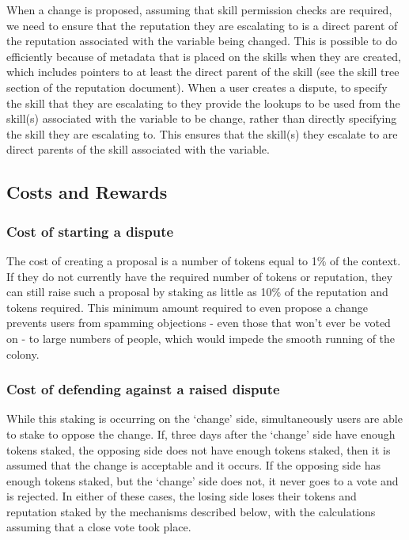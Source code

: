 When a change is proposed, assuming that skill permission checks are required, we need to ensure that the reputation they are escalating to is a direct parent of the reputation associated with the variable being changed. This is possible to do efficiently because of metadata that is placed on the skills when they are created, which includes pointers to at least the direct parent of the skill (see the skill tree section of the reputation document). When a user creates a dispute, to specify the skill that they are escalating to they provide the lookups to be used from the skill(s) associated with the variable to be change, rather than directly specifying the skill they are escalating to. This ensures that the skill(s) they escalate to are direct parents of the skill associated with the variable.

\subsection{Costs and Rewards}\label{sec:costs-of-disputes}
\subsubsection{Cost of starting a dispute}
The cost of creating a proposal is a number of tokens equal to 1\% of the context. If they do not currently have the required number of tokens or reputation, they can still raise such a proposal by staking as little as 10\% of the reputation and tokens required. This minimum amount required to even propose a change prevents users from spamming objections - even those that won’t ever be voted on - to large numbers of people, which would impede the smooth running of the colony.

\subsubsection{Cost of defending against a raised dispute}
While this staking is occurring on the `change' side, simultaneously users are able to stake to oppose the change. If, three days after the `change' side have enough tokens staked, the opposing side does not have enough tokens staked, then it is assumed that the change is acceptable and it occurs. If the opposing side has enough tokens staked, but the `change' side does not, it never goes to a vote and is rejected. In either of these cases, the losing side loses their tokens and reputation staked by the mechanisms described below, with the calculations assuming that a close vote took place.

